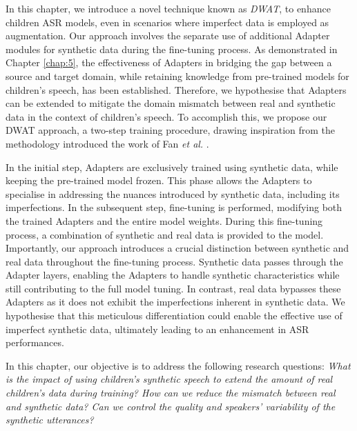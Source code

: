 In this chapter, we introduce a novel technique known as \textit{\ac{DWAT}}, to enhance children \ac{ASR} models, even in scenarios where imperfect data is employed as augmentation. Our approach involves the separate use of additional Adapter modules for synthetic data during the fine-tuning process. As demonstrated in Chapter \ref{chap:5}, the effectiveness of Adapters in bridging the gap between a source and target domain, while retaining knowledge from pre-trained models for children's speech, has been established. Therefore, we hypothesise that Adapters can be extended to mitigate the domain mismatch between real and synthetic data in the context of children's speech. To accomplish this, we propose our \ac{DWAT} approach, a two-step training procedure, drawing inspiration from the methodology introduced the work of Fan \textit{et al.} \cite{fan2022draft}.


In the initial step, Adapters are exclusively trained using synthetic data, while keeping the pre-trained model frozen. This phase allows the Adapters to specialise in addressing the nuances introduced by synthetic data, including its imperfections. In the subsequent step, fine-tuning is performed, modifying both the trained Adapters and the entire model weights. During this fine-tuning process, a combination of synthetic and real data is provided to the model. Importantly, our approach introduces a crucial distinction between synthetic and real data throughout the fine-tuning process. Synthetic data passes through the Adapter layers, enabling the Adapters to handle synthetic characteristics while still contributing to the full model tuning. In contrast, real data bypasses these Adapters as it does not exhibit the imperfections inherent in synthetic data. We hypothesise that this meticulous differentiation could enable the effective use of imperfect synthetic data, ultimately leading to an enhancement in \ac{ASR} performances.


In this chapter, our objective is to address the following research questions: \textit{What is the impact of using children's synthetic speech to extend the amount of real children's data during training? How can we reduce the mismatch between real and synthetic data? Can we control the quality and speakers’ variability of the synthetic utterances?}


